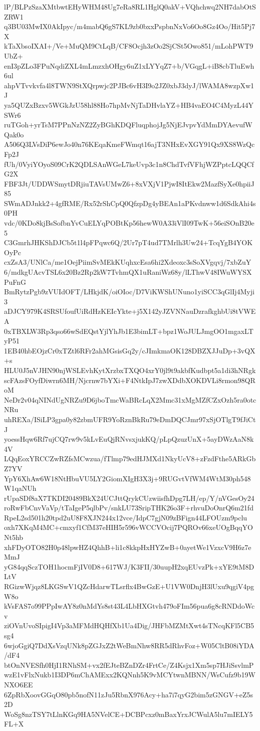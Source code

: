 lP/BLPzSzaXMtbwtEHyWHM48Ug7eRa8RL1HglQ0akV+VQhchwq2NH7dabOtSZRW1
q3BU03MwIX0AkIpyc/m4mabQ6gS7KL9zb0bxxPspbnNxVo6Oo8Gz4Oo/Hit5Pj7X
kTaXbsoIXAI+/Ve+MuQM9CtLqB/CF8Ocjh3zOo2SjCSt5Owo851/mLohPWT9UbZ+
enI3pZLo3FPuNqdiZXL4mLmzxhOHgy6uZ1xLYYqZ7+b/VGqgL+iB8cbTluEwh6ul
ahpVTvvkvfa4l8TWN9StXQrpwjc2PJBc6vH3I9o2JZ0xbJ3dyJ/lWAMA8wzpXw1J
ya5QUZxBzxv5WGkJzU58hl88Ho7hpMvNjTaDHvlaYZ+HB4vaEO4C4MyzL44YSWr6
ruTGoh+yrTsM7PPnNzNZ2ZyBGhKDQFluqphojJg5NjEJvpvYdMmDYAevufWQak0o
A506Q3LVsDiP6ewJo40n76KEqaKmeFWmqt16ajT3NHxEvXGY91Qx9XS8WzQcFp2J
fUh/0VyiYOyoS09CrK2QDLSAnWGeL7keUvp3c1n8ChdTvfVFhjWZPptcLQQCfG2X
FBF3Jt/UDDWSmytDRjiuTAVsUMwZ6+8xVXjV1PjwI8ItEkw2MazfSyXe0hpiiJ85
SWmADJnkk2+4gfRME/Rx52rShCpQ0QfzpDg4yBEAn1aPKvdnww1d6SdkAhi4s0PH
vdc/0KDo8kjBsSofbnYvCuELYqPOBtKp56hewW0A33iVlI09TwK+56eiSOnB20e5
C3GmrhJHKShDJCb5t1l4pFPqwc6Q/2Ur7pT4ud7TMrlh3Uw24+TcqYgB4YOKOyPc
cxZsA3/UNlCa/me1OejPiimSvMEkKUqhxcEsa6hi2Xdeoxc3sSoXVgqvj/7xbZuY
6/mdkgUAcvTSL6x20Bz2Rp2kW7TvhmQX1uRaniWz68y/lLThwV48IWuWYSXPuFnG
BmRytzPgb9zVUIdOFT/LHkjdK/oiOIoc/D7ViKWShUNuno1yiSCC3qGlIj4Myji3
aDJCY979K4SRSUfoufUiRdHzKEIcYkte+j5X142yJZVNNauDzrafkghbUi8tVWEA
0xTBXLW3Rp3qso66wSdEQstYjlYhJb1E3bimLT+bpz1WoJULJmgOO1mgaxLTyP51
1EB40hbEOjzCr0xTZtl6RFr2ahMGsisGq2y/cJImkmaOK128DBZXJJuDp+3vQX+s
HLU0J5nVJHN90njWSLEvhKytXrzbxTXQO4xrY0jl9t9akbfKudbpt5a1di3hNRgk
scFAzsFOyfDiwrn6MH/Njcrnw7bYXi+F4NtkIpJ7zwXDdbXOKDVLi8rmon98QRoM
NeDr2v04qNINdUgNRZu9D6jboTmcWaBRcLqX2Mmc31xMgMZfCZxOzh5ra0otcNRu
uhREXa/ISiLP3gpa0y82zbmUFR9YoRznBkRu79eDmDQCJmr97xSjOTlgT9fJiCtJ
yoessHqw6Rf7ujCQ7rw9v5kLvEuQjRNvsxjukKQ/pLpQzuzUnX+5ayDWzAaN8k4V
LQqEoxYRCCZwRZfsMCwzua/fTlmp79edHJMXd1NkyUcV8+zFzdFthe5ARkGbZ7YV
YpY6XhAw6W18NtHbuVU5LY2GiomXIgH3X3j+9RUGvtVfWM4WtM30ph548W1qaNUh
rUpaSDf8aX7TKDI20489BkX24UCJttQrykCUzwiisfhDpg7LH/ep/Y/nVGesOy24
roRwFbCnvVaVp/tTaIgeP5qlbPv/snkLU73SripTHK26o3F+rhvuDoOnrQ6m21fd
RpeL2sd501h20tpd2uU8F8XJN244x12vce/IdpC7gjN09zBFign44LFOUzm9pclu
oxh7XKqM4MC+cmxyf1CfM37eHIH5r596vWCCVOcij7PQROv66xeUOgBqqYONt5hb
xhFDyOTO82H0p48lpwHZ4QhhB+li1c8kkpHxHYZwB+0ayetWe1VzxcV9H6z7eMmJ
yG84qqSczTOH1hocmFjIV0D8+617WJ/K3FII/30uupH2xqEUvzPk+xYE9tM8DLtV
RGizwWjqz8LKGSwV1QZcHdarwTLsrflx4BwGzE+U1VW0DnjH3lUxu9qgiV4pgW8o
kVsFAS7o99PPpIwAY8z0nMdYs8st43L4LbHXGtvh479oFIm56pua6g8cRNDdoWcv
ziOVnUvoSIpigI4Vp3aMFMdHQHfXb1Ua4Dig/JHFbMZMtXwt4sTNcqKFl5CB5sg4
6wjoGgiQ7DdXsVzqUNk8pZGJxZ2tWeBmNhw8RR5dRhvFoz+W05CltB08iYDA/dF4
btOnNVESfh0HjI1RNhSM+vx2fEJteBZnDZr4FrtCe/Z4Ksjx1Xm5sp7HJiSsvlmP
wzE1vFlxNukb1I3DP6mChAMExx2KQNnh5K9vMCYtwnMBNN/WsCufz9b19WNXO6EE
6ZpRbXoovGGqO80pb5nofN11zJu5RbnX976Acy+ha7i7qyG2bim5zGNGV+eZ5s2D
WoSg8nzTSY7tLlnKGq9HA5NVelCE+DCBPcxz0mBaxYrxJCWulA5lu7mIELY5FL+X
